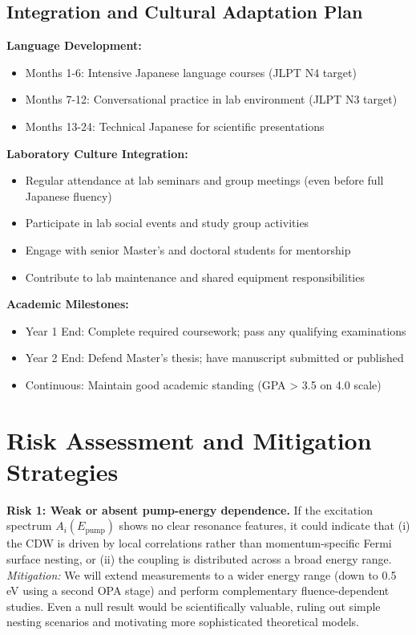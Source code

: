 \documentclass[12pt,a4paper]{article}
\begin{document}
\subsection{Integration and Cultural Adaptation Plan}

\textbf{Language Development:}
\begin{itemize}
    \item Months 1-6: Intensive Japanese language courses (JLPT N4 target)
    \item Months 7-12: Conversational practice in lab environment (JLPT N3 target)
    \item Months 13-24: Technical Japanese for scientific presentations
\end{itemize}

\textbf{Laboratory Culture Integration:}
\begin{itemize}
    \item Regular attendance at lab seminars and group meetings (even before full Japanese fluency)
    \item Participate in lab social events and study group activities
    \item Engage with senior Master's and doctoral students for mentorship
    \item Contribute to lab maintenance and shared equipment responsibilities
\end{itemize}

\textbf{Academic Milestones:}
\begin{itemize}
    \item Year 1 End: Complete required coursework; pass any qualifying examinations
    \item Year 2 End: Defend Master's thesis; have manuscript submitted or published
    \item Continuous: Maintain good academic standing (GPA > 3.5 on 4.0 scale)
\end{itemize}

\section{Risk Assessment and Mitigation Strategies}

\textbf{Risk 1: Weak or absent pump-energy dependence.} If the excitation spectrum $A_i(E_{\text{pump}})$ shows no clear resonance features, it could indicate that (i) the CDW is driven by local correlations rather than momentum-specific Fermi surface nesting, or (ii) the coupling is distributed across a broad energy range. \textit{Mitigation:} We will extend measurements to a wider energy range (down to 0.5 eV using a second OPA stage) and perform complementary fluence-dependent studies. Even a null result would be scientifically valuable, ruling out simple nesting scenarios and motivating more sophisticated theoretical models.
\end{document}
